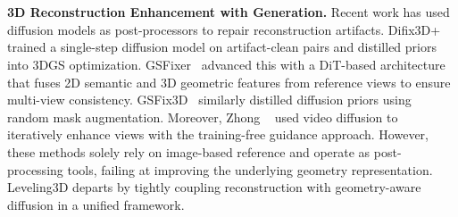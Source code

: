 \\
\\
\noindent \textbf{3D Reconstruction Enhancement with Generation.} Recent work has used diffusion models as post-processors to repair reconstruction artifacts. Difix3D+~\cite{wu2025difix3d+}  trained a single-step diffusion model on artifact-clean pairs and distilled priors into 3DGS optimization. GSFixer~\cite{yin2025gsfixer} advanced this with a DiT-based architecture that fuses 2D semantic and 3D geometric features from reference views to ensure multi-view consistency. GSFix3D~\cite{wei2025gsfix3d} similarly distilled diffusion priors using random mask augmentation. Moreover, Zhong \etal~\cite{zhong2025taming} used video diffusion to iteratively enhance views with the training-free guidance approach. However, these methods solely rely on image-based reference and operate as post-processing tools, failing at improving the underlying geometry representation. Leveling3D departs by tightly coupling reconstruction with geometry-aware diffusion in a unified framework.